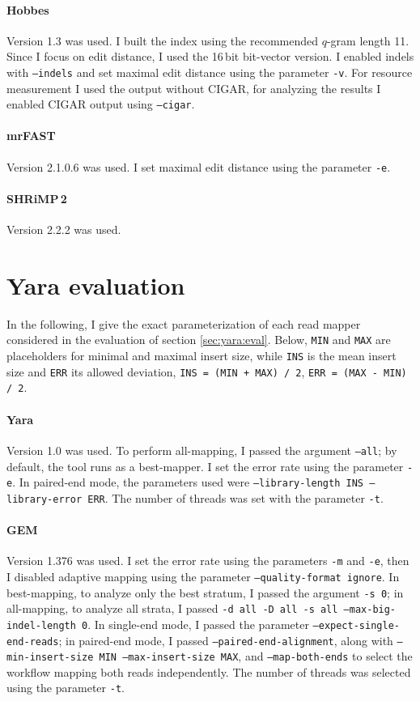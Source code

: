 \paragraph{Hobbes}
Version 1.3 was used.
I built the index using the recommended $q$-gram length 11.
Since I focus on edit distance, I used the 16\,bit bit-vector version.
I enabled indels with \texttt{--indels} and set maximal edit distance using the parameter \texttt{-v}.
For resource measurement I used the output without CIGAR, for analyzing the results I enabled CIGAR output using \texttt{--cigar}.

\paragraph{mrFAST}
Version 2.1.0.6 was used.
I set maximal edit distance using the parameter \texttt{-e}.

\paragraph{SHRiMP\,2}
Version 2.2.2 was used.


\section{Yara evaluation}
\label{sup:yara:param}

In the following, I give the exact parameterization of each read mapper considered in the evaluation of section \ref{sec:yara:eval}.
Below, \texttt{MIN} and \texttt{MAX} are placeholders for minimal and maximal insert size, while \texttt{INS} is the mean insert size and \texttt{ERR} its allowed deviation, \ie \texttt{INS = (MIN + MAX) / 2}, \texttt{ERR = (MAX - MIN) / 2}.

\paragraph{Yara}
Version 1.0 was used.
To perform all-mapping, I passed the argument \texttt{--all}; by default, the tool runs as a best-mapper.
I set the error rate using the parameter \texttt{-e}.
In paired-end mode, the parameters used were \texttt{--library-length INS --library-error ERR}.
The number of threads was set with the parameter \texttt{-t}.

\paragraph{GEM}
Version 1.376 was used.
I set the error rate using the parameters \texttt{-m} and \texttt{-e}, then I disabled adaptive mapping using the parameter \texttt{--quality-format ignore}.
In best-mapping, to analyze only the best stratum, I passed the argument \texttt{-s 0};
in all-mapping, to analyze all strata, I passed \texttt{-d all -D all -s all --max-big-indel-length 0}.
In single-end mode, I passed the parameter \texttt{--expect-single-end-reads}; in paired-end mode, I passed \texttt{--paired-end-alignment}, along with \texttt{--min-insert-size MIN --max-insert-size MAX}, and \texttt{--map-both-ends} to select the workflow mapping both reads independently.
The number of threads was selected using the parameter \texttt{-t}.

